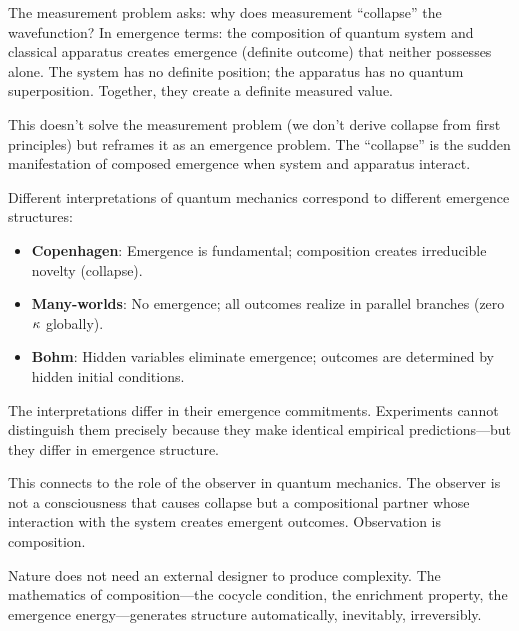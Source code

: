 \begin{interpretation}
The measurement problem asks: why does measurement ``collapse'' the wavefunction?
In emergence terms: the composition of quantum system and classical apparatus
creates emergence (definite outcome) that neither possesses alone. The system
has no definite position; the apparatus has no quantum superposition. Together,
they create a definite measured value.

This doesn't solve the measurement problem (we don't derive collapse from first
principles) but reframes it as an emergence problem. The ``collapse'' is the
sudden manifestation of composed emergence when system and apparatus interact.

Different interpretations of quantum mechanics correspond to different emergence
structures:
\begin{itemize}
  \item \textbf{Copenhagen}: Emergence is fundamental; composition creates
    irreducible novelty (collapse).
  \item \textbf{Many-worlds}: No emergence; all outcomes realize in parallel
    branches (zero $\kappa$ globally).
  \item \textbf{Bohm}: Hidden variables eliminate emergence; outcomes are
    determined by hidden initial conditions.
\end{itemize}

The interpretations differ in their emergence commitments. Experiments cannot
distinguish them precisely because they make identical empirical predictions---but
they differ in emergence structure.

This connects to the role of the observer in quantum mechanics. The observer is
not a consciousness that causes collapse but a compositional partner whose
interaction with the system creates emergent outcomes. Observation is composition.
\end{interpretation}

Nature does not need an external designer to produce complexity. The mathematics
of composition---the cocycle condition, the enrichment property, the emergence
energy---generates structure automatically, inevitably, irreversibly.
